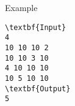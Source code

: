 Example
\begin{verbatim}
\textbf{Input}
4
10 10 10 2
10 10 3 10
4 10 10 10
10 5 10 10
\textbf{Output}
5
\end{verbatim}
